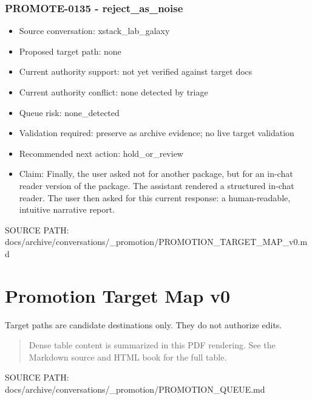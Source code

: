 \documentclass[11pt,a4paper]{report}
\begin{document}
\subsubsection{PROMOTE-0135 - reject\_as\_noise}

\begin{itemize}
\item Source conversation: xstack\_lab\_galaxy
\item Proposed target path: none
\item Current authority support: not yet verified against target docs
\item Current authority conflict: none detected by triage
\item Queue risk: none\_detected
\item Validation required: preserve as archive evidence; no live target validation
\item Recommended next action: hold\_or\_review
\item Claim: Finally, the user asked not for another package, but for an in-chat reader version of the package. The assistant rendered a structured in-chat reader. The user then asked for this current response: a human-readable, intuitive narrative report.
\end{itemize}



{\small\raggedright SOURCE PATH: docs/\allowbreak{}archive/\allowbreak{}conversations/\allowbreak{}\_\allowbreak{}promotion/\allowbreak{}PROMOTION\_\allowbreak{}TARGET\_\allowbreak{}MAP\_\allowbreak{}v0.md\par}


\section{Promotion Target Map v0}

Target paths are candidate destinations only. They do not authorize edits.


\begin{quote}\small Dense table content is summarized in this PDF rendering. See the Markdown source and HTML book for the full table.\end{quote}



{\small\raggedright SOURCE PATH: docs/\allowbreak{}archive/\allowbreak{}conversations/\allowbreak{}\_\allowbreak{}promotion/\allowbreak{}PROMOTION\_\allowbreak{}QUEUE.md\par}
\end{document}
